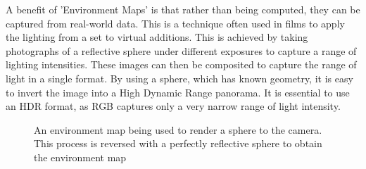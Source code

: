 \documentclass[ %
                    author={Gavin Parker},
                supervisor={Dr. Neill Campbell},
                    degree={MEng},
                     title={Deep Siamese Networks for Illumination Estimation from Stereo Images},
                  subtitle={},
                      type={research},
                      year={2018} ]{dissertation}
\begin{document}
\newline
A benefit of 'Environment Maps' is that rather than being computed, they can be captured from real-world data. This is a technique often used in films to apply the lighting from a set to virtual additions. This is achieved by taking photographs of a reflective sphere under different exposures to capture a range of lighting intensities. These images can then be composited to capture the range of light in a single format. By using a sphere, which has known geometry, it is easy to invert the image into a High Dynamic Range panorama. It is essential to use an HDR format, as RGB captures only a very narrow range of light intensity.
\begin{center}
\begin{figure}
\label{environment map}
\caption{An environment map being used to render a sphere to the camera. This process is reversed with a perfectly reflective sphere to obtain the environment map}
\end{figure}
\end{center}
\end{document}

